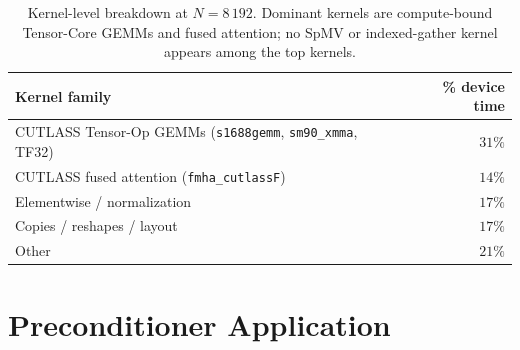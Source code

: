 \documentclass[acmtog,anonymous,review]{acmart}
\theoremstyle{plain}
\begin{document}
\begin{table}[t]
\centering
\caption{Kernel-level breakdown at $N\!=\!8\,192$. Dominant kernels are compute-bound
Tensor-Core GEMMs and fused attention; no SpMV or indexed-gather kernel appears among the
top kernels.}
\label{tab:breakdown-kernel}
\footnotesize\setlength{\tabcolsep}{4pt}
\begin{tabular}{@{}lr@{}}
\toprule
Kernel family & \% device time \\
\midrule
CUTLASS Tensor-Op GEMMs (\texttt{s1688gemm}, \texttt{sm90\_xmma}, TF32) & $31\%$ \\
CUTLASS fused attention (\texttt{fmha\_cutlassF}) & $14\%$ \\
Elementwise / normalization                       & $17\%$ \\
Copies / reshapes / layout                        & $17\%$ \\
Other                                             & $21\%$ \\
\bottomrule
\end{tabular}
\end{table}

\section{Preconditioner Application}
\label{sec:application}
\end{document}
